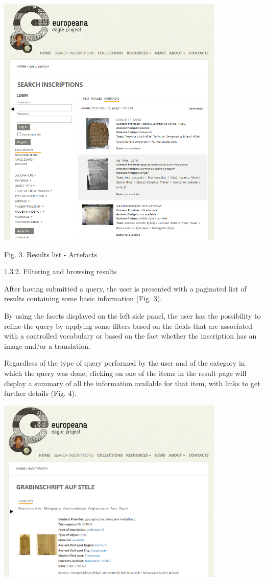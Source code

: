 \documentclass[amsthm,ebook]{saparticle}
\begin{document}
 \includegraphics[width=10.874cm,height=12.197cm]{EAGLE2016submissionXX-img003.png} 

Fig. 3. Results list - Artefacts


\bigskip

1.3.2. Filtering and browsing results


\bigskip

After having submitted a query, the user is presented with a paginated list of results containing some basic information
(Fig. 3). 

By using the facets displayed on the left side panel, the user has the possibility to refine the query by applying some
filters based on the fields that are associated with a controlled vocabulary or based on the fact whether the
inscription has an image and/or a translation.

Regardless of the type of query performed by the user and of the category in which the query was done, clicking on one
of the items in the result page will display a summary of all the information available for that item, with links to
get further details (Fig. 4).


\bigskip

 \includegraphics[width=10.874cm,height=8.864cm]{EAGLE2016submissionXX-img004.png} 
\end{document}
